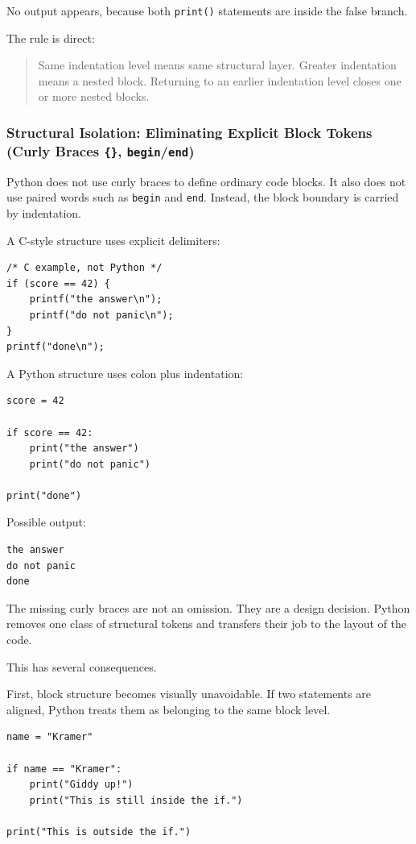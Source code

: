 No output appears, because both \texttt{print()} statements are inside the false branch.

The rule is direct:

\begin{quote}
Same indentation level means same structural layer. Greater indentation means a nested block. Returning to an earlier indentation level closes one or more nested blocks.
\end{quote}

\subsubsection{Structural Isolation: Eliminating Explicit Block Tokens (Curly Braces \texttt{\{\}}, \texttt{begin}/\texttt{end})}

Python does not use curly braces to define ordinary code blocks. It also does not use paired words such as \texttt{begin} and \texttt{end}. Instead, the block boundary is carried by indentation.

A C-style structure uses explicit delimiters:

\begin{verbatim}
/* C example, not Python */
if (score == 42) {
    printf("the answer\n");
    printf("do not panic\n");
}
printf("done\n");
\end{verbatim}

A Python structure uses colon plus indentation:

\begin{verbatim}
score = 42

if score == 42:
    print("the answer")
    print("do not panic")

print("done")
\end{verbatim}

Possible output:

\begin{verbatim}
the answer
do not panic
done
\end{verbatim}

The missing curly braces are not an omission. They are a design decision. Python removes one class of structural tokens and transfers their job to the layout of the code.

This has several consequences.

First, block structure becomes visually unavoidable. If two statements are aligned, Python treats them as belonging to the same block level.

\begin{verbatim}
name = "Kramer"

if name == "Kramer":
    print("Giddy up!")
    print("This is still inside the if.")

print("This is outside the if.")
\end{verbatim}


